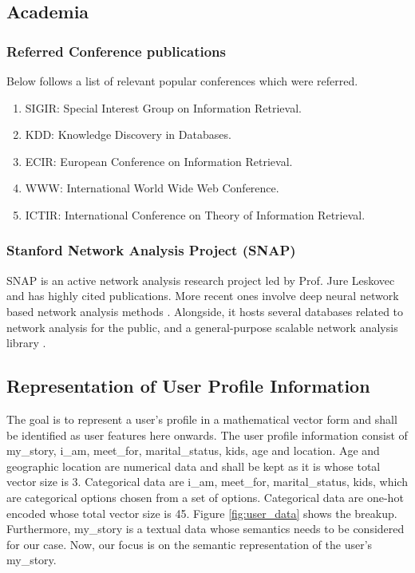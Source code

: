 \documentclass{kththesis}
\begin{document}
\subsection{Academia}
\subsubsection{Referred Conference publications}
\noindent Below follows a list of relevant popular conferences which were referred. 
\begin{enumerate}
    \item SIGIR: Special Interest Group on Information Retrieval.
    \item KDD: Knowledge Discovery in Databases.
    \item ECIR: European Conference on Information Retrieval.
    \item WWW: International World Wide Web Conference.
    \item ICTIR: International Conference on Theory of Information Retrieval.
\end{enumerate}
\subsubsection{Stanford Network Analysis Project (SNAP)}
\noindent SNAP is an active network analysis research project led by Prof. Jure Leskovec and has highly cited publications. More recent ones involve deep neural network based network analysis methods \cite{PinSage}. Alongside, it hosts several databases related to network analysis for the public, and a general-purpose scalable network analysis library \cite{snap}.

\subsection{Representation of User Profile Information}
The goal is to represent a user's profile in a mathematical vector form and shall be identified as user features here onwards. The user profile information consist of my\_story, i\_am, meet\_for, marital\_status, kids, age and location. Age and geographic location are numerical data and shall be kept as it is whose total vector size is 3. Categorical data are i\_am, meet\_for, marital\_status, kids, which are categorical options chosen from a set of options. Categorical data are one-hot encoded whose total vector size is 45. Figure \ref{fig:user_data} shows the breakup. Furthermore, my\_story is a textual data whose semantics needs to be considered for our case. Now, our focus is on the semantic representation of the user's my\_story. \\
\end{document}
